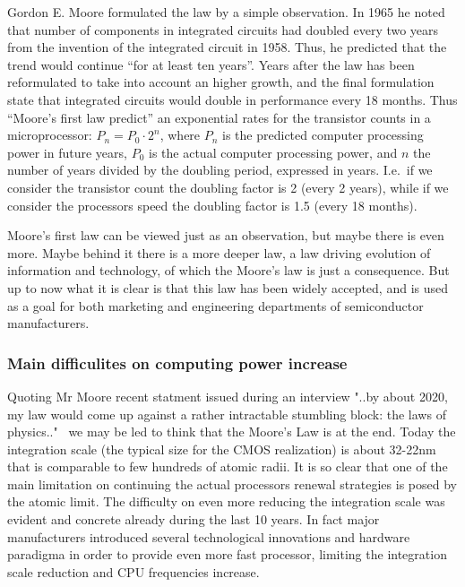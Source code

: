 Gordon E. Moore formulated the law by a simple observation. In 1965 he noted that number of components
in integrated circuits had doubled every two years from the invention of the integrated circuit in 1958. Thus, he predicted that the trend would continue ``for at least ten years''. Years after the law has been
reformulated to take into account an higher growth, and the final formulation state that integrated circuits
would double in performance every 18 months. Thus ``Moore's first law predict'' an exponential rates for the transistor counts in a microprocessor: $P_n = P_0 \cdot 2^n$, where $P_n$ is the predicted computer processing power in
future years, $P_0$ is the actual computer processing power, and $n$ the number of years divided by the doubling period, expressed in years. I.e.\ if we consider the transistor count the doubling factor is 2 (every 2 years), while if we consider the processors speed the doubling factor is 1.5 (every 18 months).

Moore's first law can be viewed just as an observation, but maybe there is even more. Maybe behind
it there is a more deeper law, a law driving evolution of information and technology, of which the
Moore's law is just a consequence. But up to now what it is clear is that this law has been
widely accepted, and is used as a goal for both marketing and engineering departments of semiconductor
manufacturers. %

\FloatBarrier
\subsubsection{Main difficulites on computing power increase}

Quoting Mr Moore recent statment  issued during an interview "..by about 2020, my law would come up against a rather 
intractable stumbling block: the laws of physics.."~\cite{MooresFrase1}  we may be led to think that the Moore's Law is at the end.
Today the integration scale (the typical size for the CMOS realization) is about 32-22nm that is comparable to few hundreds of atomic radii. It is so clear that one of the main limitation on continuing the actual processors renewal 
strategies is posed by the atomic limit. The difficulty on even more reducing the integration scale was evident and concrete already during the last 10 years. In fact major manufacturers introduced several technological 
innovations and hardware paradigma in order to provide even more fast processor, limiting the  integration scale reduction  and CPU frequencies increase. 

